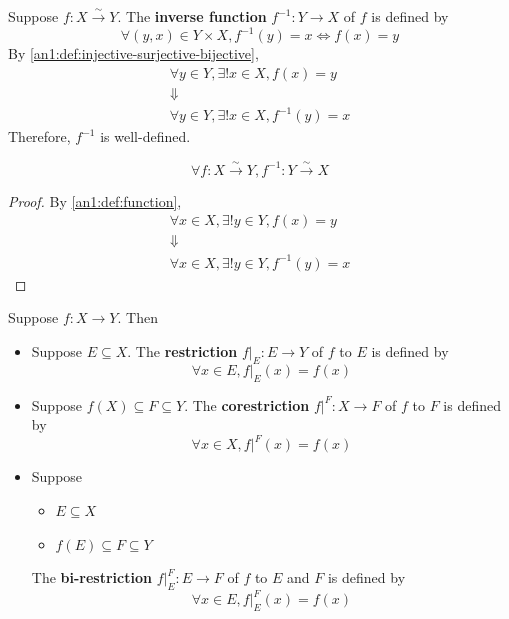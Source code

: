 \begin{definition} \label{an1:def:inverse-function}
  Suppose $f: X \xrightarrow{\sim} Y$. The \textbf{inverse function} $f^{-1}: Y \to X$ of $f$ is defined by
  \[
    \forall (y, x) \in Y \times X, f^{-1}(y) = x \iff f(x) = y
  \]
  By \cref{an1:def:injective-surjective-bijective},
  \[
    \begin{array}{c}
      \forall y \in Y, \exists! x \in X, f(x) = y \\
      \Downarrow                                  \\
      \forall y \in Y, \exists! x \in X, f^{-1}(y) = x
    \end{array}
  \]
  Therefore, $f^{-1}$ is well-defined.
\end{definition}

\begin{theorem} \label{an1:thm:inverse-function-is-bijective}
  \[
    \forall f: X \xrightarrow{\sim} Y, f^{-1}: Y \xrightarrow{\sim} X
  \]
\end{theorem}

\begin{proof}
  By \cref{an1:def:function},
  \[
    \begin{array}{c}
      \forall x \in X, \exists! y \in Y, f(x) = y \\
      \Downarrow                                  \\
      \forall x \in X, \exists! y \in Y, f^{-1}(y) = x
    \end{array}
  \]
\end{proof}

\begin{definition} \label{an1:def:restriction-function}
  Suppose $f: X \to Y$. Then
  \begin{itemize}
    \item Suppose $E \subseteq X$. The \textbf{restriction} $f|_{E}: E \to Y$ of $f$ to $E$ is defined by
          \[
            \forall x \in E, f|_{E}(x) = f(x)
          \]
    \item Suppose $f(X) \subseteq F \subseteq Y$. The \textbf{corestriction} $f|^{F}: X \to F$ of $f$ to $F$ is defined by
          \[
            \forall x \in X, f|^{F}(x) = f(x)
          \]
    \item Suppose
          \begin{itemize}
            \item $E \subseteq X$
            \item $f(E) \subseteq F \subseteq Y$
          \end{itemize}
          The \textbf{bi-restriction} $f|_{E}^{F}: E \to F$ of $f$ to $E$ and $F$ is defined by
          \[
            \forall x \in E, f|_{E}^{F}(x) = f(x)
          \]
  \end{itemize}
\end{definition}

